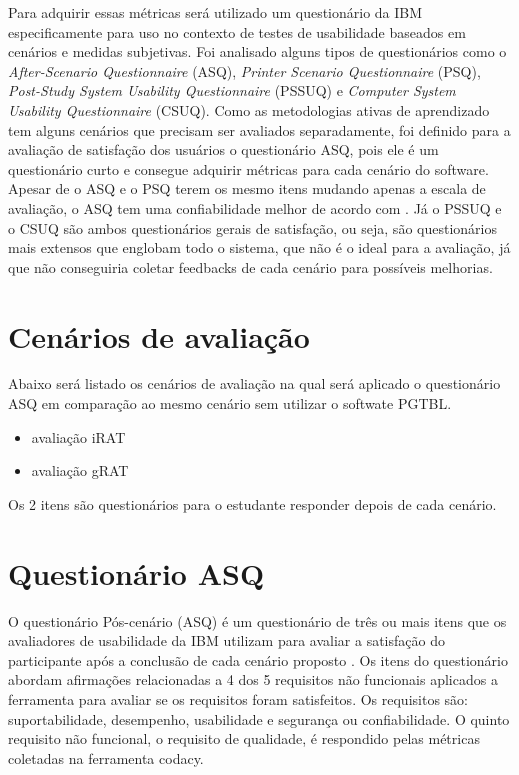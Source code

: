 Para adquirir essas métricas será utilizado um questionário da IBM especificamente para uso no contexto de testes de
usabilidade baseados em cenários e medidas subjetivas. Foi analisado alguns tipos de questionários como o
\textit{After-Scenario Questionnaire} (ASQ), \textit{Printer Scenario Questionnaire} (PSQ), \textit{Post-Study System
Usability Questionnaire} (PSSUQ) e \textit{Computer System Usability Questionnaire} (CSUQ). Como as metodologias ativas
de aprendizado tem alguns cenários que precisam ser avaliados separadamente, foi definido para a avaliação de satisfação
dos usuários o questionário ASQ, pois ele é um questionário curto e consegue adquirir métricas para cada cenário do
software. Apesar de o ASQ e o PSQ terem os mesmo itens mudando apenas a escala de avaliação, o ASQ tem uma
confiabilidade melhor de acordo com \cite{questionario}. Já o PSSUQ e o CSUQ são ambos questionários gerais de
satisfação, ou seja, são questionários mais extensos que englobam todo o sistema, que não é o ideal para a avaliação, já
que não conseguiria coletar feedbacks de cada cenário para possíveis melhorias.

\section{Cenários de avaliação}

Abaixo será listado os cenários de avaliação na qual será aplicado o questionário ASQ em comparação ao mesmo cenário sem
utilizar o softwate PGTBL.

\begin{itemize}
  \item avaliação iRAT
  \item avaliação gRAT
\end{itemize}

Os 2 itens são questionários para o estudante responder depois de cada cenário.

\section{Questionário ASQ}

O questionário Pós-cenário (ASQ) é um questionário de três ou mais itens que os avaliadores de usabilidade da IBM utilizam para
avaliar a satisfação do participante após a conclusão de cada cenário proposto \cite{questionario}. Os itens do
questionário abordam afirmações relacionadas a 4 dos 5 requisitos não funcionais aplicados a ferramenta para avaliar se
os requisitos foram satisfeitos. Os requisitos são: suportabilidade, desempenho, usabilidade e segurança ou
confiabilidade. O quinto requisito não funcional, o requisito de qualidade, é respondido pelas métricas
coletadas na ferramenta codacy.

